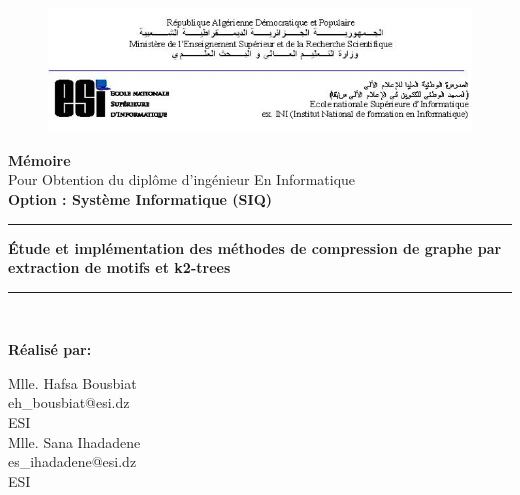 \begin{titlepage}





	\begin{figure}[t]
		\includegraphics[scale=0.75]{./ressources/image/ESI.png}\\[0.6in]
	\end{figure}
	
	
	
	\begin{center}
	
		\LARGE \textbf{ Mémoire}\\
		\Large{
			Pour Obtention du diplôme d'ingénieur En Informatique\\
			\textbf{Option : Système Informatique (SIQ)}
		}\\[0.2in]
		\huge {
		\rule{\linewidth}{.5pt}
			\textbf{
				Étude et implémentation des méthodes de compression de graphe par extraction de motifs et k2-trees
			} 
			\rule{\linewidth}{.5pt}
		}\\[0.5in]
		\Large
	
	\textbf{Réalisé par:}\\
	\begin{multicols}{2}
			\Large 	Mlle. Hafsa Bousbiat\\
			\large eh\_bousbiat@esi.dz\\
			ESI\\
		\columnbreak
 			\Large Mlle. Sana Ihadadene\\
			\large es\_ihadadene@esi.dz\\
			ESI \\
		

\end{multicols}
\end{center}
\end{titlepage}
